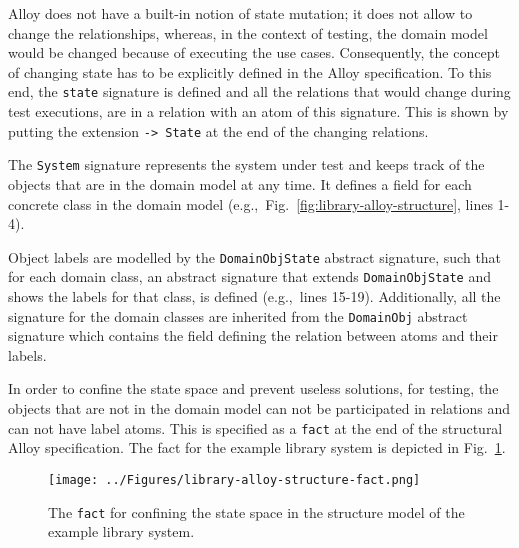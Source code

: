 Alloy does not have a built-in notion of state mutation; it does not allow to change the relationships, whereas, in the context of testing, the domain model would be changed because of executing the use cases. Consequently, the concept of changing state has to be explicitly defined in the Alloy specification. To this end, the \texttt{state} signature is defined and all the relations that would change during test executions, are in a relation with an atom of this signature. This is shown by putting the extension \texttt{-> State} at the end of the changing relations.

The \texttt{System} signature represents the system under test and keeps track of the objects that are in the domain model at any time. It defines a field for each concrete class in the domain model (e.g.,\ Fig.~\ref{fig:library-alloy-structure}, lines 1-4).

Object labels are modelled by the \texttt{DomainObjState} abstract signature, such that for each domain class, an abstract signature that extends \texttt{DomainObjState} and shows the labels for that class, is defined (e.g.,\ lines 15-19). Additionally, all the signature for the domain classes are inherited from the \texttt{DomainObj} abstract signature which contains the field defining the relation between atoms and their labels.

In order to confine the state space and prevent useless solutions, for testing, the objects that are not in the domain model can not be participated in relations and can not have label atoms. This is specified as a \texttt{fact} at the end of the structural Alloy specification. The fact for the example library system is depicted in Fig.~\ref{fig:library-alloy-structure-fact}.

\begin{figure}[h]
\centering
\texttt{[image: ../Figures/library-alloy-structure-fact.png]}
\caption{The \texttt{fact} for confining the state space in the structure model of the example library system.}
\label{fig:library-alloy-structure-fact}
\end{figure}


